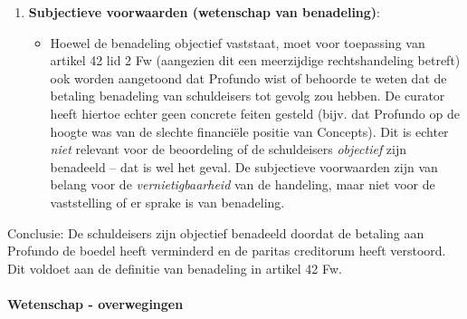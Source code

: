 \documentclass[
  dutch,
  a4paper,
]{article}
\providecommand{\tightlist}{%
  \setlength{\itemsep}{0pt}\setlength{\parskip}{0pt}}
\begin{document}
\begin{enumerate}
  \begin{itemize}
  \tightlist
  \item
    In ECLI:NL:RBAMS:2023:897 (r.o. 1.12) oordeelde de rechtbank dat een wegboeking van een rekening-courantvordering paulianeus was omdat deze leidde tot benadeling van schuldeisers door verstoring van de paritas creditorum, ook al was er geen sprake van een directe vermogensvermindering. Dit is vergelijkbaar met de onderhavige casus, waar de betaling aan Profundo de boedel ten nadele van andere schuldeisers verminderde.
  \item
    In ECLI:NL:RBLEE:2004:AR1614 (r.o. 4.2-4.3) oordeelde de rechtbank dat betalingen die voortvloeiden uit een afspraak tussen partijen \emph{niet} paulianeus waren, omdat zonder die betalingen de activa en passiva van de schuldenaar gelijk zouden zijn gebleven. In de onderhavige casus is dit \emph{niet} het geval: zonder de betaling aan Profundo zou het bedrag van € 552.500,00 in de boedel zijn gebleven en ten goede zijn gekomen aan \emph{alle} schuldeisers, in plaats van slechts aan Profundo.
  \end{itemize}
\item
  \textbf{Subjectieve voorwaarden (wetenschap van benadeling)}:

  \begin{itemize}
  \tightlist
  \item
    Hoewel de benadeling objectief vaststaat, moet voor toepassing van artikel 42 lid 2 Fw (aangezien dit een meerzijdige rechtshandeling betreft) ook worden aangetoond dat Profundo wist of behoorde te weten dat de betaling benadeling van schuldeisers tot gevolg zou hebben. De curator heeft hiertoe echter geen concrete feiten gesteld (bijv. dat Profundo op de hoogte was van de slechte financiële positie van Concepts). Dit is echter \emph{niet} relevant voor de beoordeling of de schuldeisers \emph{objectief} zijn benadeeld -- dat is wel het geval. De subjectieve voorwaarden zijn van belang voor de \emph{vernietigbaarheid} van de handeling, maar niet voor de vaststelling of er sprake is van benadeling.
  \end{itemize}
\end{enumerate}

Conclusie: De schuldeisers zijn objectief benadeeld doordat de betaling aan Profundo de boedel heeft verminderd en de paritas creditorum heeft verstoord. Dit voldoet aan de definitie van benadeling in artikel 42 Fw.

\paragraph{Wetenschap - overwegingen}\label{wetenschap---overwegingen-39}
\end{document}
